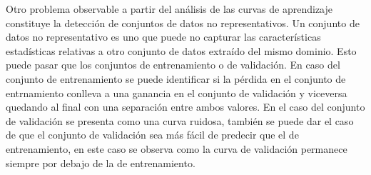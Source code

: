 Otro problema observable a partir del análisis de las curvas de aprendizaje constituye la detección de conjuntos
de datos no representativos. Un conjunto de datos no representativo es uno que puede no 
capturar las características estadísticas relativas a otro conjunto de datos extraído del mismo dominio.
Esto puede pasar que los conjuntos de entrenamiento o de validación. En caso del conjunto de entrenamiento
se puede identificar si la pérdida en el conjunto de entrnamiento conlleva a una ganancia en el conjunto de 
validación y viceversa quedando al final con una separación entre ambos valores. En el caso del conjunto de 
validación se presenta como una curva ruidosa, también se puede dar el caso de que el conjunto  de validación
sea más fácil de predecir que el de entrenamiento, en este caso se observa como la curva de validación permanece
siempre por debajo de la de entrenamiento.

